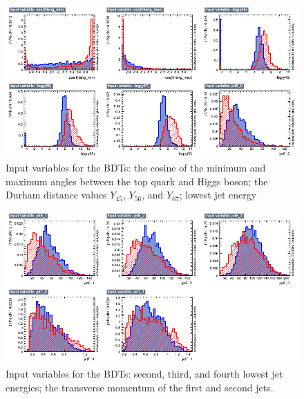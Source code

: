 \begin{figure}[p]
	\centering
	\includegraphics[width=1.0\textwidth]{../Pictures/Analysis/BDTs/variables_id_c4.png}
	\caption{Input variables for the BDTs: the cosine of the minimum and maximum angles between the top quark and Higgs boson; the Durham distance values $Y_{45}$, $Y_{56}$, and $Y_{67}$; lowest jet energy}
	\label{figure:analysis/results/tmva-inputs-4}
\end{figure}

\begin{figure}[h]
	\centering
	\includegraphics[width=1.0\textwidth]{../Pictures/Analysis/BDTs/variables_id_c5.png}
	\caption{Input variables for the BDTs: second, third, and fourth lowest jet energies; the transverse momentum of the first and second jets.}
	\label{figure:analysis/results/tmva-inputs-5}
\end{figure}

